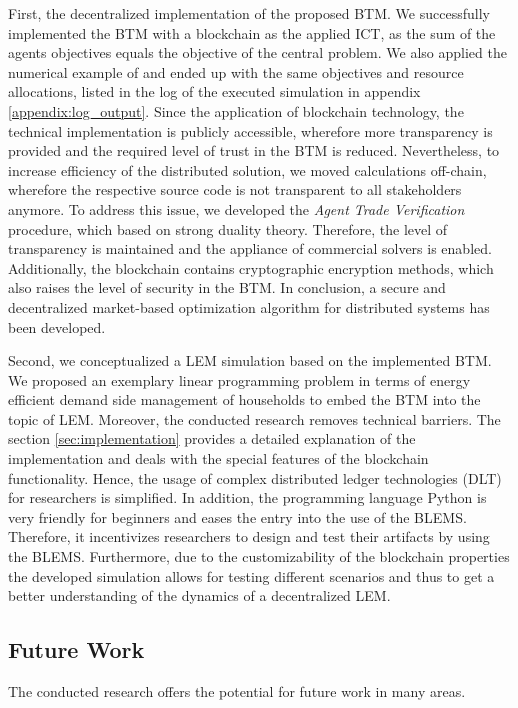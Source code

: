 First, the decentralized implementation of the proposed BTM. 
We successfully implemented the BTM with a blockchain as the applied ICT, 
as the sum of the agents objectives equals the objective of the central problem. 
We also applied the numerical example of  and 
ended up with the same objectives and resource allocations, listed in the log 
of the executed simulation in appendix \ref{appendix:log_output}.
Since the application of blockchain technology, the technical implementation
is publicly accessible, wherefore more transparency is provided and the 
required level of trust in the BTM is reduced. 
Nevertheless, to increase efficiency of the distributed solution,
we moved calculations off-chain, wherefore the respective source code 
is not transparent to all stakeholders anymore.
To address this issue, we developed the \textit{Agent Trade Verification} procedure,
which based on strong duality theory.
Therefore, the level of transparency is maintained and
the appliance of commercial solvers is enabled. 
Additionally, the blockchain contains cryptographic encryption methods,
which also raises the level of security in the BTM.
In conclusion, a secure and decentralized market-based optimization algorithm for distributed systems has 
been developed.

Second, we conceptualized a LEM simulation based on the implemented
BTM. We proposed an exemplary linear programming problem in terms of 
energy efficient demand side management of households to embed the BTM into the topic of LEM.
Moreover, the conducted research removes technical barriers.
The section \ref{sec:implementation} provides a detailed 
explanation of the implementation and deals with the special features 
of the blockchain functionality.
Hence, the usage of complex distributed ledger technologies (DLT) for researchers
is simplified. 
In addition, the programming language Python is very 
friendly for beginners and eases the entry into the use of the BLEMS.
Therefore, it incentivizes researchers 
to design and test their artifacts by using the BLEMS.
Furthermore, due to the customizability of the blockchain properties 
the developed simulation allows for testing different scenarios and thus 
to get a better understanding of the dynamics of a decentralized LEM.

\subsection{Future Work}
The conducted research offers the potential for future work in many areas.


